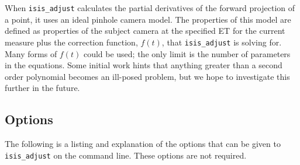 When \texttt{isis\_adjust} calculates the partial derivatives of the
forward projection of a point, it uses an ideal pinhole camera model.
The properties of this model are defined as properties of the subject
camera at the specified \ac{ET} for the current measure plus the
correction function, $f(t)$, that \texttt{isis\_adjust} is solving
for.  Many forms of $f(t)$ could be used; the only limit is the
number of parameters in the equations. Some initial work hints that
anything greater than a second order polynomial becomes an ill-posed
problem, but we hope to investigate this further in the future.

\subsection{Options}

The following is a listing and explanation of the options that can be
given to \texttt{isis\_adjust} on the command line. These options are
not required.

